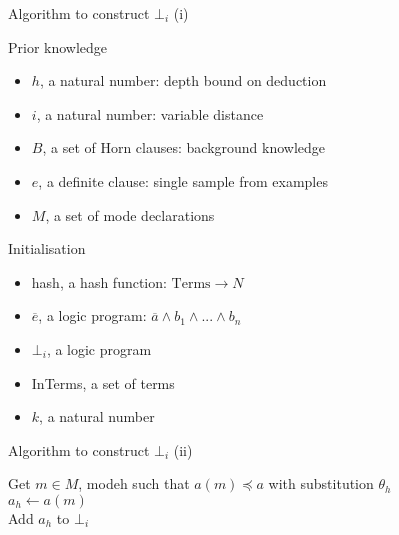 \begin{frame}{Algorithm to construct $\bot_i$ (i)}

\vfill
\begin{block}{Prior knowledge}
\begin{itemize}
    \item $h$, a natural number: depth bound on deduction
    \item $i$, a natural number: variable distance
    \item $B$, a set of Horn clauses: background knowledge
    \item $e$, a definite clause: single sample from examples
    \item $M$, a set of mode declarations
\end{itemize}
\end{block}
\vfill
\begin{block}{Initialisation}
\begin{itemize}
    \item hash, a hash function: $\text{Terms} \rightarrow N$
    \item $\overline{e}$, a logic program: $\overline{a} \land b_1 \land ... \land b_n$
    \item $\bot_i$, a logic program
    \item InTerms, a set of terms
    \item $k$, a natural number
\end{itemize}
\end{block}
\vfill

\end{frame}


\begin{frame}{Algorithm to construct $\bot_i$ (ii)}
\begin{algorithm}[H]
\scriptsize
\caption{Construct $\bot_i$ - Part 1}\label{alg:bot1}

Get $m \in M$, modeh such that $a(m) \preceq a$ with substitution $\theta_h$ \\
$a_h \gets a(m)$ \\
Add $a_h$ to $\bot_i$ \\

\end{algorithm}    
\end{frame}

